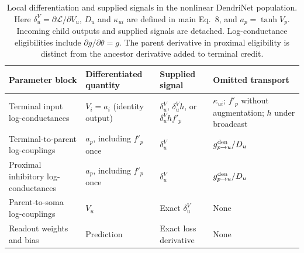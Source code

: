 \begin{table}[p]
\centering
\caption{Local differentiation and supplied signals in the nonlinear DendriNet population. Here $\delta_u^V=\partial\mathcal L/\partial V_u$, $D_u$ and $\kappa_{ui}$ are defined in main Eq.~8, and $a_p=\tanh V_p$. Incoming child outputs and supplied signals are detached. Log-conductance eligibilities include $\partial g/\partial\theta=g$. The parent derivative in proximal eligibility is distinct from the ancestor derivative added to terminal credit.}
\label{tab:population_coordinates}
\small
\begin{tabular}{p{}p{}p{}p{}}
\toprule
Parameter block & Differentiated quantity & Supplied signal & Omitted transport \\
\midrule
Terminal input log-conductances & $V_i=a_i$ (identity output) & $\delta_u^V$, $\delta_u^Vh$, or $\delta_u^Vhf'_p$ & $\kappa_{ui}$; $f'_p$ without augmentation; $h$ under broadcast \\
Terminal-to-parent log-couplings & $a_p$, including $f'_p$ once & $\delta_u^V$ & $g_{p\to u}^{\rm den}/D_u$ \\
Proximal inhibitory log-conductances & $a_p$, including $f'_p$ once & $\delta_u^V$ & $g_{p\to u}^{\rm den}/D_u$ \\
Parent-to-soma log-couplings & $V_u$ & Exact $\delta_u^V$ & None \\
Readout weights and bias & Prediction & Exact loss derivative & None \\
\bottomrule
\end{tabular}
\end{table}
